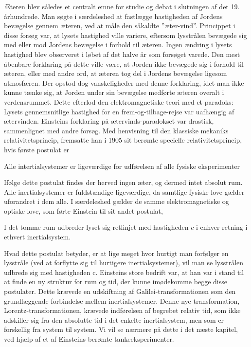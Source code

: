 Æteren blev således et centralt emne for studie og debat i slutningen af det 19. århundrede. Man søgte i særdeleshed at fastlægge hastigheden af Jordens bevægelse gennem æteren, ved at måle den såkaldte ”æter-vind”. Princippet i disse forsøg var, at lysets hastighed ville variere, eftersom lysstrålen bevægede sig med eller mod Jordens bevægelse i forhold til æteren. Ingen ændring i lysets hastighed blev observeret i løbet af det halve år som forsøget varede. Den mest åbenbare forklaring på dette ville være, at Jorden ikke bevægede sig i forhold til æteren, eller med andre ord, at æteren tog del i Jordens bevægelse ligesom atmosfæren. Der opstod dog vanskeligheder med denne forklaring, idet man ikke kunne tænke sig, at Jorden under sin bevægelse medførte æteren overalt i verdensrummet. Dette efterlod den elektromagnetiske teori med et paradoks: Lysets gennemsnitlige hastighed for en frem-og-tilbage-rejse var uafhængig af ætervinden.
Einsteins forklaring på ætervinds-paradokset var drastisk, sammenlignet med andre forsøg. Med henvisning til den klassiske mekaniks relativitetsprincip, fremsatte han i 1905 sit berømte specielle relativitetsprincip, hvis første postulat er

\begin{framed}
	\centering
	Alle intertialsystemer er ligeværdige for udførelsen af alle fysiske eksperimenter
\end{framed}

Ifølge dette postulat findes der herved ingen æter, og dermed intet absolut rum. Alle inertialsystemer er fuldstændige ligeværdige, da samtlige fysiske love gælder uforandret i dem alle. I særdeleshed gælder de samme elektromagnetiske og optiske love, som førte Einstein til sit andet postulat,

\begin{framed}
	\centering
	I det tomme rum udbreder lyset sig retlinjet med hastigheden $c$ i enhver retning i ethvert inertialsystem.
\end{framed}

Hvad dette postulat betyder, er at lige meget hvor hurtigt man forfølger en lysstråle (ved at forflytte sig til hurtigere inertialsystemer), vil man se lysstrålen udbrede sig med hastigheden c. Einsteins store bedrift var, at han var i stand til at finde en ny struktur for rum og tid, der kunne imødekomme begge disse postulater. Dette krævede en udskiftning af Galilei-transformationen som den grundlæggende forbindelse mellem inertialsystemer. Denne nye transformation, Lorentz-transformationen, krævede indførelsen af begrebet relativ tid, som ikke adskiller sig fra den absolutte tid i det enkelte inertialsystem, men som er forskellig fra system til system. Vi vil se nærmere på dette i det næste kapitel, ved hjælp af et af Einsteins berømte tankeeksperimenter.

